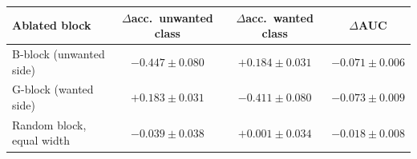 \begin{tabular}{@{}lccc@{}}
\toprule
Ablated block & $\Delta$acc.\ unwanted class & $\Delta$acc.\ wanted class & $\Delta$AUC \\
\midrule
B-block (unwanted side) & $-0.447\pm0.080$ & $+0.184\pm0.031$ & $-0.071\pm0.006$ \\
G-block (wanted side) & $+0.183\pm0.031$ & $-0.411\pm0.080$ & $-0.073\pm0.009$ \\
Random block, equal width & $-0.039\pm0.038$ & $+0.001\pm0.034$ & $-0.018\pm0.008$ \\
\bottomrule
\end{tabular}